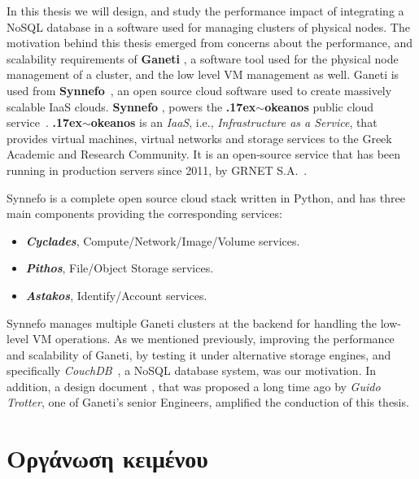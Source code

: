 In this thesis we will design, and study the performance impact of integrating a
NoSQL database in a software used for managing clusters of physical nodes. The
motivation behind this thesis emerged from concerns about the performance, and
scalability requirements of \textbf{Ganeti}
, a software tool used for the physical
node management of a cluster, and the low level VM management as well. Ganeti is
used from \textbf{Synnefo}~, an open source cloud
software used to create massively scalable IaaS clouds. \textbf{Synnefo}
\cite{synnefo}, powers the \textbf{\raise.17ex\hbox{$\scriptstyle\sim$}okeanos}
public cloud service~\cite{okeanos}.
\textbf{\raise.17ex\hbox{$\scriptstyle\sim$}okeanos} is an \emph{IaaS}, i.e.,
\emph{Infrastructure as a Service}, that provides virtual machines, virtual
networks and storage services to the Greek Academic and Research Community. It
is an open-source service that has been running in production servers since
2011, by GRNET S.A.~.

Synnefo is a complete open source cloud stack written in Python, and has three
main components providing the corresponding services:

\begin{itemize}
  \item \textbf{\emph{Cyclades}}, Compute/Network/Image/Volume services.
  \item \textbf{\emph{Pithos}}, File/Object Storage services.
  \item \textbf{\emph{Astakos}}, Identify/Account services.
\end{itemize}

Synnefo manages multiple Ganeti clusters at the backend for handling the
low-level VM operations. As we mentioned previously, improving the performance
and scalability of Ganeti, by testing it under alternative storage engines, and
specifically \emph{CouchDB}~, a NoSQL database
system, was our motivation. In addition, a design document
, that
was proposed a long time ago by \emph{Guido Trotter}, one of Ganeti's senior
Engineers, amplified the conduction of this thesis.

\section{Οργάνωση κειμένου}

